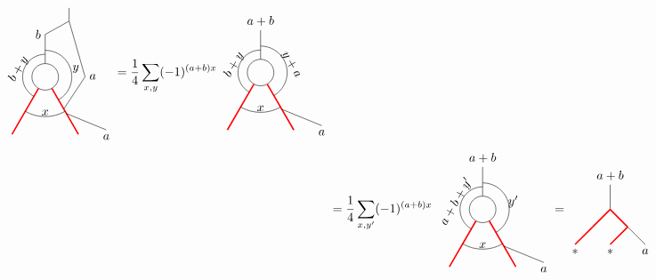 \begin{align}
\begin{tikzpicture}[scale=.75,baseline=(current bounding box.center)]
		\draw (0,0) circle (0.5cm);
		\draw[red,line width=0.4mm]
		\foreach \a in {-60, -120} {
			(\a:0.5) -- (\a:2.5)
		};
		\draw[] (90:0.5) -- (90:1.6);
		\draw ([shift=(-60:1cm)]0,0) arc (-60:90:1cm);
		\draw ([shift=(-120:1.5cm)]0,0) arc (-120:-60:1.5cm);
		\draw ([shift=(240:0.85cm)]0,0) arc (240:90:0.85cm);
		\draw[] (0,1.6) -- (0.9,2.1) node[pos=0,left] {$b$};
		\draw[] (0.9,2.1) -- (0.9,2.6);
		\draw (-60:1.6) -- (2.3,-2) node[pos=1,below] {$a$};
		\draw (-60:1.4) --(1.5,0) node[right]{$a$} -- (0.9,2.1);
		\node[rotate=60] at (-1,0.3) {$b+y$};
		\node at (1.15,0.3) {$y$};
		\node at (0,-1.35) {$x$};
		\end{tikzpicture}
		=\frac{1}{4}\sum_{x,y}(-1)^{(a+b)x}
		\begin{tikzpicture}[scale=.75,baseline=(current bounding box.center)]
		\draw (0,0) circle (0.5cm);
		\draw[red,line width=0.4mm]
		\foreach \a in {-60, -120} {
			(\a:0.5) -- (\a:2.5)
		};
		\draw[] (90:0.5) -- (90:1.6) node[pos=1,above]{$a+b$};
		\draw ([shift=(-60:1cm)]0,0) arc (-60:90:1cm);
		\draw ([shift=(-120:1.5cm)]0,0) arc (-120:-60:1.5cm);
		\draw ([shift=(240:0.85cm)]0,0) arc (240:90:0.85cm);
		\draw (-60:1.6) -- (2.3,-2) node[pos=1,below] {$a$};
		\node[rotate=60] at (-1,0.3) {$b+y$};
		\node[rotate=-60] at (1.15,0.3) {$y+a$};
		\node at (0,-1.35) {$x$};
		\end{tikzpicture}\\
		&=\frac{1}{4}\sum_{x,y^\prime}(-1)^{(a+b)x}
		\begin{tikzpicture}[scale=.75,baseline=(current bounding box.center)]
		\draw (0,0) circle (0.5cm);
		\draw[red,line width=0.4mm]
		\foreach \a in {-60, -120} {
			(\a:0.5) -- (\a:2.5)
		};
		\draw[] (90:0.5) -- (90:1.6) node[pos=1,above]{$a+b$};
		\draw ([shift=(-60:1cm)]0,0) arc (-60:90:1cm);
		\draw ([shift=(-120:1.5cm)]0,0) arc (-120:-60:1.5cm);
		\draw ([shift=(240:0.85cm)]0,0) arc (240:90:0.85cm);
		\draw (-60:1.6) -- (2.3,-2) node[pos=1,below] {$a$};
		\node[rotate=60] at (-1,0.3) {$a+b+y^\prime$};
		\node at (1.15,0.3) {$y^\prime$};
		\node at (0,-1.35) {$x$};
		\end{tikzpicture}
		=\begin{tikzpicture}[xscale=-1,scale=0.7,baseline=(current bounding box.center)]
		\draw[] (0,0) -- (0,1) node[pos=1,above]{$a+b$};
		\draw[red,line width=0.4mm] (0,0) -- (-0.707107,-0.707107);
		\draw[] (-0.707107,-0.707107) -- (-1.41421,-1.41421);
		\draw[red,line width=0.4mm] (-0.707107,-0.707107) -- (0,-1.41421);
		\draw[red,line width=0.4mm] (0,0) -- (0.707107,-0.707107);
		\draw[red,line width=0.4mm] (0.707107,-0.707107) -- (1.41421,-1.41421);
		\node at (-1.41421,-1.7) {$a$};
		\node at (0,-1.7) {$*$};
		\node at (1.41421,-1.7) {$*$};
		\end{tikzpicture}
	\end{align}

